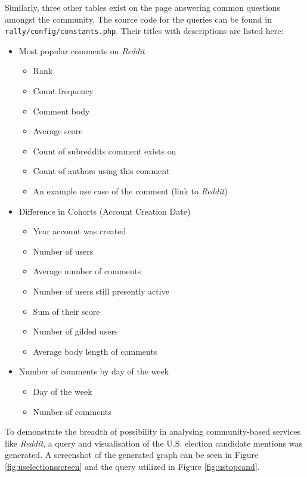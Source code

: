 \documentclass[msc,oneside]{ubcthesis}%
\begin{document}
Similarly, three other tables exist on the page answering common questions amongst the community. The source code for the queries can be found in \texttt{rally/config/constants.php}. Their titles with descriptions are listed here:
\begin{itemize}
\item{Most popular comments on \textit{Reddit}}
	\begin{itemize}
	\item{Rank}
	\item{Count frequency}
	\item{Comment body}
	\item{Average score}
	\item{Count of subreddits comment exists on}
	\item{Count of authors using this comment}
	\item{An example use case of the comment (link to \textit{Reddit})}
	\end{itemize}
	
\item{Difference in Cohorts (Account Creation Date)}
	\begin{itemize}
	\item{Year account was created}
	\item{Number of users}
	\item{Average number of comments}
	\item{Number of users still presently active}
	\item{Sum of their score}
	\item{Number of gilded users}
	\item{Average body length of comments}
	\end{itemize}
	
\item{Number of comments by day of the week}
	\begin{itemize}
	\item{Day of the week}
	\item{Number of comments}
	\end{itemize}
\end{itemize}

To demonstrate the breadth of possibility in analysing community-based services like \textit{Reddit}, a query and visualisation of the U.S. election candidate mentions was generated. A screenshot of the generated graph can be seen in Figure \ref{fig:uselectionsscreen} and the query utilized in Figure \ref{fig:ustopcand}.
\end{document}
